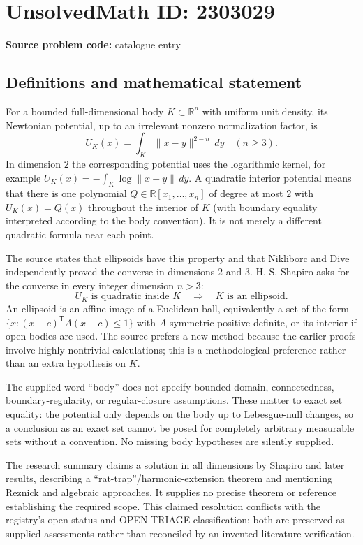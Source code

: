 \documentclass[11pt]{article}
\newcommand{\R}{\mathbb{R}}
\begin{document}
\section*{UnsolvedMath ID: 2303029}
\textbf{Source problem code:} catalogue entry
\subsection{Definitions and mathematical statement}
For a bounded full-dimensional body $K\subset\R^n$ with uniform unit density, its Newtonian potential, up to an irrelevant nonzero normalization factor, is
\[
U_K(x)=\int_K\|x-y\|^{2-n}\,dy\quad(n\geq3).
\]
In dimension $2$ the corresponding potential uses the logarithmic kernel, for example $U_K(x)=-\int_K\log\|x-y\|\,dy$. A quadratic interior potential means that there is one polynomial $Q\in\R[x_1,\ldots,x_n]$ of degree at most $2$ with $U_K(x)=Q(x)$ throughout the interior of $K$ (with boundary equality interpreted according to the body convention). It is not merely a different quadratic formula near each point.

The source states that ellipsoids have this property and that Nikliborc and Dive independently proved the converse in dimensions $2$ and $3$. H. S. Shapiro asks for the converse in every integer dimension $n>3$:
\[
U_K\text{ is quadratic inside }K
\quad\Longrightarrow\quad
K\text{ is an ellipsoid}.
\]
An ellipsoid is an affine image of a Euclidean ball, equivalently a set of the form $\{x:(x-c)^{\mathsf T}A(x-c)\leq1\}$ with $A$ symmetric positive definite, or its interior if open bodies are used. The source prefers a new method because the earlier proofs involve highly nontrivial calculations; this is a methodological preference rather than an extra hypothesis on $K$.

The supplied word ``body'' does not specify bounded-domain, connectedness, boundary-regularity, or regular-closure assumptions. These matter to exact set equality: the potential only depends on the body up to Lebesgue-null changes, so a conclusion as an exact set cannot be posed for completely arbitrary measurable sets without a convention. No missing body hypotheses are silently supplied.

The research summary claims a solution in all dimensions by Shapiro and later results, describing a ``rat-trap''/harmonic-extension theorem and mentioning Reznick and algebraic approaches. It supplies no precise theorem or reference establishing the required scope. This claimed resolution conflicts with the registry's open status and OPEN-TRIAGE classification; both are preserved as supplied assessments rather than reconciled by an invented literature verification.
\end{document}

